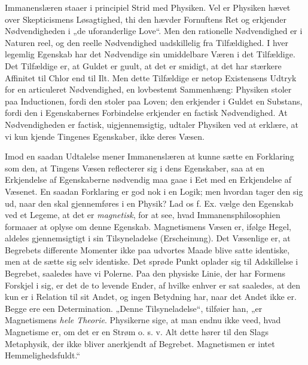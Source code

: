 \documentclass[12pt,a4paper]{book}
\begin{document}
Immanenslæren staaer i principiel Strid med Physiken. Vel er Physiken
hævet over Skepticismens Løsagtighed, thi den hævder Fornuftens Ret og
erkjender Nødvendigheden i „de uforanderlige Love“. Men den rationelle
Nødvendighed er i Naturen reel, og den reelle Nødvendighed
uadskillelig fra
Tilfældighed. I hver legemlig Egenskab har det Nødvendige sin
umiddelbare Væren i det Tilfældige. Det Tilfældige er, at Guldet er
guult, at det er smidigt, at det har stærkere Affinitet til Chlor end
til Ilt. Men dette Tilfældige er netop Existensens Udtryk for en
articuleret Nødvendighed, en lovbestemt Sammenhæng: Physiken stoler
paa Inductionen, fordi den stoler paa Loven; den erkjender i Guldet en
Substans, fordi den i Egenskabernes Forbindelse erkjender en factisk
Nødvendighed. At Nødvendigheden er factisk, uigjennemsigtig, udtaler
Physiken ved at erklære, at vi kun kjende Tingenes Egenskaber, ikke
deres Væsen.

Imod en saadan Udtalelse mener Immanenslæren at kunne sætte en
Forklaring som den, at Tingens Væsen reflecterer sig i dens
Egenskaber, saa at en Erkjendelse af Egenskaberne nødvendig maa gaae i
Eet med en Erkjendelse af Væsenet. En saadan Forklaring er god nok i
en Logik; men hvordan tager den sig ud, naar den skal gjennemføres i
en Physik? Lad os f. Ex. vælge den Egenskab ved et Legeme, at det er
\emph{magnetisk}, for at see, hvad Immanensphilosophien formaaer at
oplyse om denne Egenskab. Magnetismens Væsen er, ifølge Hegel, aldeles
gjennemsigtigt i sin Tilsyneladelse (Erscheinung). Det Væsenlige er,
at Begrebets differente Momenter ikke paa udvortes Maade blive satte
identiske, men at de sætte sig selv identiske. Det sprøde Punkt
oplader sig til Adskillelse i Begrebet, saaledes have vi Polerne. Paa
den physiske Linie, der har Formens Forskjel i sig, er det de to
levende Ender, af hvilke enhver er sat saaledes, at den kun er i
Relation til sit Andet, og ingen Betydning har, naar det Andet ikke
er. Begge ere een Determination. „Denne Tilsyneladelse“, tilføier
han, „er Magnetismens \emph{hele Theorie}. Physikerne sige, at man
endnu ikke veed, hvad Magnetisme er, om det er en Strøm o. s. v. Alt
dette hører til den Slags Metaphysik, der ikke
bliver anerkjendt af Begrebet. Magnetismen er intet
Hemmelighedsfuldt.“
\end{document}
